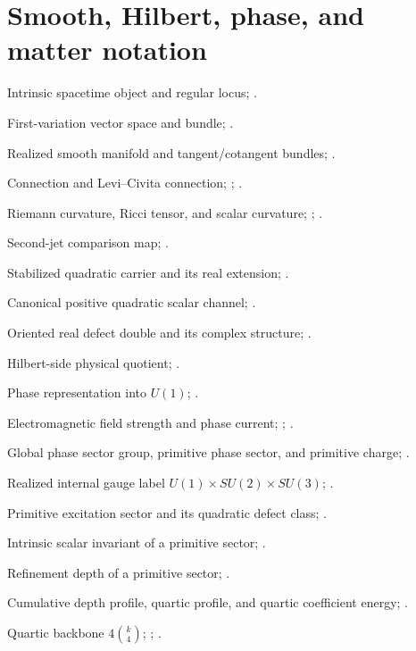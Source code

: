 \section*{Smooth, Hilbert, phase, and matter notation}
\begin{description}[leftmargin=4.1cm,style=nextline,itemsep=0.2em,before=\raggedright]
\item[\(ST,ST^{\reg}\)]
Intrinsic spacetime object and regular locus; .
\item[\(V_p,T^{(1)}ST^{\reg}\)]
First-variation vector space and bundle; .
\item[\(M,TM,T^*M\)]
Realized smooth manifold and tangent/cotangent bundles;
.
\item[\(\nabla,\LC\)]
Connection and Levi--Civita connection; ;
.
\item[\(\Riem,\Ric,\Scal\)]
Riemann curvature, Ricci tensor, and scalar curvature;
; .
\item[\(\Jtwo\)]
Second-jet comparison map; .
\item[\(\mathcal K,\mathcal K_{\mathbb R}\)]
Stabilized quadratic carrier and its real extension;
.
\item[\(Q\)]
Canonical positive quadratic scalar channel; .
\item[\(H_{\mathbb R},J\)]
Oriented real defect double and its complex structure;
.
\item[\(\PhysH\)]
Hilbert-side physical quotient; .
\item[\(\rho_{\mathrm{ph}}\)]
Phase representation into \(U(1)\); .
\item[\(F,J_{\mathrm{ph}}\)]
Electromagnetic field strength and phase current;
; .
\item[\(\mathsf P_\infty,\mathfrak p_0,q_0\)]
Global phase sector group, primitive phase sector, and primitive charge;
.
\item[\(G_{\mathrm{int}}\)]
Realized internal gauge label \(U(1)\times SU(2)\times SU(3)\);
.
\item[\(\sigma,\kappa_\sigma\)]
Primitive excitation sector and its quadratic defect class;
.
\item[\(m_0(\sigma)=Q(\kappa_\sigma)\)]
Intrinsic scalar invariant of a primitive sector; .
\item[\(k_\sigma\)]
Refinement depth of a primitive sector; .
\item[\(\eta_k,\omega_k,E_4\)]
Cumulative depth profile, quartic profile, and quartic coefficient
energy; .
\item[\(q(k),B_4(k)\)]
Quartic backbone \(4\binom{k}{4}\); ;
.
\end{description}

